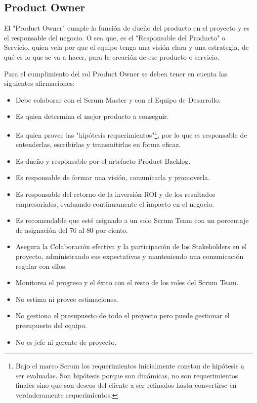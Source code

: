 \subsection{Product Owner}

El "Product Owner" cumple la función de dueño del producto en el proyecto y es el responsable del negocio. O sea que, es el "Responsable del Producto" o Servicio, quien vela por que el equipo tenga una visión clara y una estrategia, de qué es lo que se va a hacer, para la creación de ese producto o servicio.

Para el cumplimiento del rol Product Owner se deben tener en cuenta las siguientes afirmaciones:

\begin{itemize}
\item Debe colaborar con el Scrum Master y con el Equipo de Desarrollo.
\item Es quien determina el mejor producto a conseguir.
\item Es quien provee las "hipótesis requerimientos"\footnote{Bajo el marco Scrum los requerimientos inicialmente constan de hipótesis a ser evaluadas. Son hipótesis porque son dinámicas, no son requerimientos finales sino que son deseos del cliente a ser refinados hasta convertirse en verdaderamente requerimientos.}, por lo que es responsable de entenderlas, escribirlas y transmitirlas en forma eficaz.
\item Es dueño y responsable por el artefacto Product Backlog.
\item Es responsable de formar una visión, comunicarla y promoverla.
\item Es responsable del retorno de la inversión ROI y de los resultados empresariales, evaluando continuamente el impacto en el negocio.
\item Es recomendable que esté asignado a un solo Scrum Team con un porcentaje de asignación del 70 al 80 por ciento.
\item Asegura la Colaboración efectiva y la participación de los Stakeholders en el proyecto, administrando sus expectativas y manteniendo una comunicación regular con ellos.
\item Monitorea el progreso y el éxito con el resto de los roles del Scrum Team.
\item No estima ni provee estimaciones.
\item No gestiona el presupuesto de todo el proyecto pero puede gestionar el presupuesto del equipo.
\item No es jefe ni gerente de proyecto.
\end{itemize}

